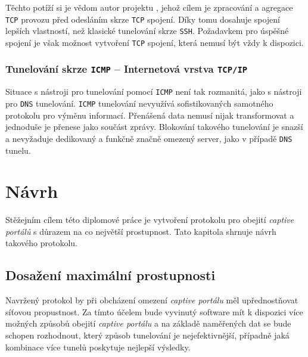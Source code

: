 \documentclass[thesis=M,czech]{FITthesis}[2012/10/20]
\begin{document}
Těchto potíží si je vědom autor projektu \cite[sshuttle]{sshuttle}, jehož cílem je zpracování a agregace \texttt{TCP} provozu před odesláním skrze \texttt{TCP} spojení. Díky tomu dosahuje spojení lepších vlastností, než klasické tunelování skrze \texttt{SSH}. Požadavkem pro úspěšné spojení je však možnost vytvoření \texttt{TCP} spojení, která nemusí být vždy k dispozici.


\subsection{Tunelování skrze \texttt{ICMP} -- Internetová vrstva \texttt{TCP/IP}}

Situace s nástroji pro tunelování pomocí \texttt{ICMP} není tak rozmanitá, jako s nástroji pro \texttt{DNS} tunelování. \texttt{ICMP} tunelování nevyužívá sofistikovaných  samotného protokolu pro výměnu informací. Přenášená data nemusí nijak transformovat a jednoduše je přenese jako součást zprávy. Blokování takového tunelování je snazší a nevyžaduje dedikovaný a funkčně značně omezený server, jako v případě \texttt{DNS} tunelu.













\chapter{Návrh}

Stěžejním cílem této diplomové práce je vytvoření protokolu pro obejití \textit{captive portálů} s důrazem na co největší prostupnost. Tato kapitola shrnuje návrh takového protokolu.


\section{Dosažení maximální prostupnosti}

Navržený protokol by při obcházení omezení \textit{captive portálu} měl upřednostňovat síťovou propustnost. Za tímto účelem bude vyvinutý software mít k dispozici více možných způsobů obejití \textit{captive portálu} a na základě naměřených dat se bude schopen rozhodnout, který způsob tunelování je nejefektivnější, případně jaká kombinace více tunelů poskytuje nejlepší výsledky.
\end{document}
